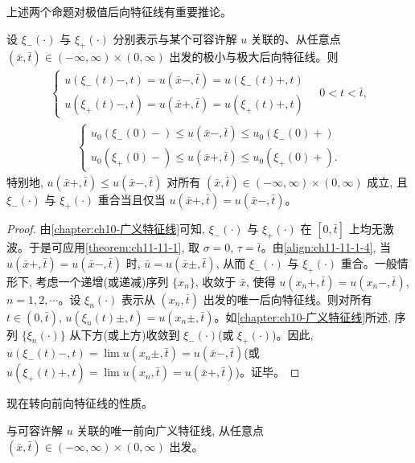 \documentclass[../../main.tex]{subfiles}
\begin{document}
上述两个命题对极值后向特征线有重要推论。

\begin{theorem}\label{theorem:ch11-11-3}
设 $\xi_-(\cdot)$ 与 $\xi_+(\cdot)$ 分别表示与某个可容许解 $u$ 关联的、从任意点 $(\bar x,\bar t)\in(-\infty,\infty)\times(0,\infty)$ 出发的极小与极大后向特征线。则
\begin{align}
\begin{cases}
u(\xi_-(t)-,t)=u(\bar x-,\bar t)=u(\xi_-(t)+,t)\\
u(\xi_+(t)-,t)=u(\bar x+,\bar t)=u(\xi_+(t)+,t)
\end{cases}\quad 0<t<\bar t,\label{align:ch11-11-1-10}
\end{align}
\begin{align}
\begin{cases}
u_0(\xi_-(0)-)\leqslant u(\bar x-,\bar t)\leqslant u_0(\xi_-(0)+)\\
u_0(\xi_+(0)-)\leqslant u(\bar x+,\bar t)\leqslant u_0(\xi_+(0)+).
\end{cases}\label{align:ch11-11-1-11}
\end{align}
特别地, $u(\bar x+,\bar t)\leqslant u(\bar x-,\bar t)$ 对所有 $(\bar x,\bar t)\in(-\infty,\infty)\times(0,\infty)$ 成立, 且 $\xi_-(\cdot)$ 与 $\xi_+(\cdot)$ 重合当且仅当 $u(\bar x+,\bar t)=u(\bar x-,\bar t)$。
\end{theorem}

\begin{proof}
由\cref{chapter:ch10-广义特征线}可知, $\xi_-(\cdot)$ 与 $\xi_+(\cdot)$ 在 $[0,\bar t]$ 上均无激波。于是可应用\cref{theorem:ch11-11-1}, 取 $\sigma=0$, $\tau=\bar t$。由\eqref{align:ch11-11-1-4}, 当 $u(\bar x+,\bar t)=u(\bar x-,\bar t)$ 时, $\bar u=u(\bar x\pm,\bar t)$, 从而 $\xi_-(\cdot)$ 与 $\xi_+(\cdot)$ 重合。一般情形下, 考虑一个递增(或递减)序列 $\{x_n\}$, 收敛于 $\bar x$, 使得 $u(x_n+,\bar t)=u(x_n-,\bar t)$, $n=1,2,\cdots$。设 $\xi_n(\cdot)$ 表示从 $(x_n,\bar t)$ 出发的唯一后向特征线。则对所有 $t\in(0,\bar t)$, $u(\xi_n(t)\pm,t)=u(x_n\pm,\bar t)$。如\cref{chapter:ch10-广义特征线}所述, 序列 $\{\xi_n(\cdot)\}$ 从下方(或上方)收敛到 $\xi_-(\cdot)$(或 $\xi_+(\cdot)$)。因此, $u(\xi_-(t)-,t)=\lim u(x_n\pm,\bar t)=u(\bar x-,\bar t)$(或 $u(\xi_+(t)+,t)=\lim u(x_n,\bar t)=u(\bar x+,\bar t)$)。证毕。

\end{proof}

现在转向前向特征线的性质。

\begin{theorem}\label{theorem:ch11-11-4}
与可容许解 $u$ 关联的唯一前向广义特征线, 从任意点 $(\bar x,\bar t)\in(-\infty,\infty)\times(0,\infty)$ 出发。
\end{theorem}
\end{document}
